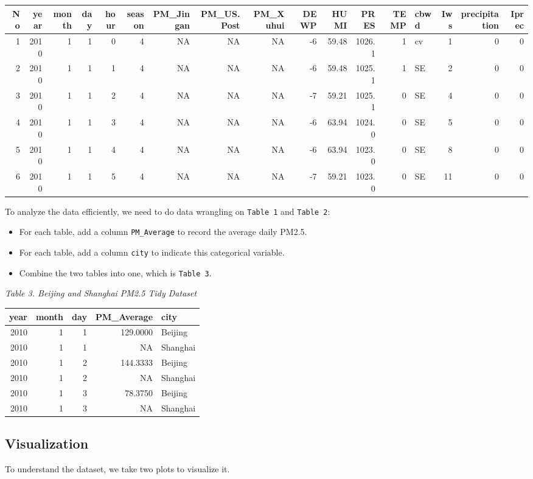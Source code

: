 \documentclass[]{article}
\begin{document}
\begin{longtable}[]{@{}rrrrrrrrrrrrrlrrr@{}}
\toprule
No & year & month & day & hour & season & PM\_Jingan & PM\_US.Post &
PM\_Xuhui & DEWP & HUMI & PRES & TEMP & cbwd & Iws & precipitation &
Iprec\tabularnewline
\midrule
\endhead
1 & 2010 & 1 & 1 & 0 & 4 & NA & NA & NA & -6 & 59.48 & 1026.1 & 1 & cv &
1 & 0 & 0\tabularnewline
2 & 2010 & 1 & 1 & 1 & 4 & NA & NA & NA & -6 & 59.48 & 1025.1 & 1 & SE &
2 & 0 & 0\tabularnewline
3 & 2010 & 1 & 1 & 2 & 4 & NA & NA & NA & -7 & 59.21 & 1025.1 & 0 & SE &
4 & 0 & 0\tabularnewline
4 & 2010 & 1 & 1 & 3 & 4 & NA & NA & NA & -6 & 63.94 & 1024.0 & 0 & SE &
5 & 0 & 0\tabularnewline
5 & 2010 & 1 & 1 & 4 & 4 & NA & NA & NA & -6 & 63.94 & 1023.0 & 0 & SE &
8 & 0 & 0\tabularnewline
6 & 2010 & 1 & 1 & 5 & 4 & NA & NA & NA & -7 & 59.21 & 1023.0 & 0 & SE &
11 & 0 & 0\tabularnewline
\bottomrule
\end{longtable}

To analyze the data efficiently, we need to do data wrangling on
\texttt{Table\ 1} and \texttt{Table\ 2}:

\begin{itemize}
\item
  For each table, add a column \texttt{PM\_Average} to record the
  average daily PM2.5.
\item
  For each table, add a column \texttt{city} to indicate this
  categorical variable.
\item
  Combine the two tables into one, which is \texttt{Table\ 3}.
\end{itemize}

\emph{Table 3. Beijing and Shanghai PM2.5 Tidy Dataset}

\begin{longtable}[]{@{}rrrrl@{}}
\toprule
year & month & day & PM\_Average & city\tabularnewline
\midrule
\endhead
2010 & 1 & 1 & 129.0000 & Beijing\tabularnewline
2010 & 1 & 1 & NA & Shanghai\tabularnewline
2010 & 1 & 2 & 144.3333 & Beijing\tabularnewline
2010 & 1 & 2 & NA & Shanghai\tabularnewline
2010 & 1 & 3 & 78.3750 & Beijing\tabularnewline
2010 & 1 & 3 & NA & Shanghai\tabularnewline
\bottomrule
\end{longtable}

\subsection{Visualization}\label{visualization}

To understand the dataset, we take two plots to visualize it.
\end{document}
